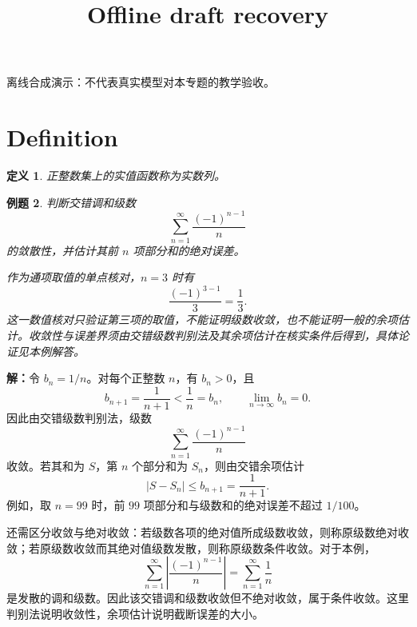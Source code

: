 \documentclass[UTF8,fontset=fandol,11pt]{ctexart}
\title{Offline draft recovery}
\date{}
\newtheorem{definition}{定义}[section]
\newtheorem{example}[definition]{例题}
\begin{document}
\maketitle
\par\noindent 离线合成演示：不代表真实模型对本专题的教学验收。\par
\section{Definition}\label{sec:S01}
\begin{definition}
正整数集上的实值函数称为实数列。
\end{definition}
\begin{example}
判断交错调和级数
\[
\sum_{n=1}^{\infty}\frac{(-1)^{n-1}}{n}
\]
的敛散性，并估计其前 $n$ 项部分和的绝对误差。

作为通项取值的单点核对，$n=3$ 时有
\[
\frac{(-1)^{3-1}}{3}=\frac13.
\]
这一数值核对只验证第三项的取值，不能证明级数收敛，也不能证明一般的余项估计。收敛性与误差界须由交错级数判别法及其余项估计在核实条件后得到，具体论证见本例解答。
\end{example}
\par\noindent\textbf{解：}令 $b_n=1/n$。对每个正整数 $n$，有 $b_n>0$，且
\[
b_{n+1}=\frac{1}{n+1}<\frac1n=b_n,
\qquad \lim_{n\to\infty}b_n=0.
\]
因此由交错级数判别法，级数
\[
\sum_{n=1}^{\infty}\frac{(-1)^{n-1}}{n}
\]
收敛。若其和为 $S$，第 $n$ 个部分和为 $S_n$，则由交错余项估计
\[
|S-S_n|\leq b_{n+1}=\frac{1}{n+1}.
\]
例如，取 $n=99$ 时，前 $99$ 项部分和与级数和的绝对误差不超过 $1/100$。

还需区分收敛与绝对收敛：若级数各项的绝对值所成级数收敛，则称原级数绝对收敛；若原级数收敛而其绝对值级数发散，则称原级数条件收敛。对于本例，
\[
\sum_{n=1}^{\infty}\left|\frac{(-1)^{n-1}}{n}\right|=\sum_{n=1}^{\infty}\frac1n
\]
是发散的调和级数。因此该交错调和级数收敛但不绝对收敛，属于条件收敛。这里判别法说明收敛性，余项估计说明截断误差的大小。\par
\end{document}
